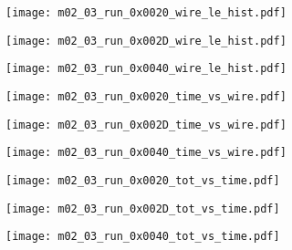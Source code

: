 \documentclass[11pt, ngerman, fleqn, DIV=15, headinclude, BCOR=2cm]{scrreprt}
\begin{document}
\begin{appendix}

	\begin{figure}
		\centering
	\begin{subfigure}[a]{0.45 \textwidth}
		\texttt{[image: m02\_03\_run\_0x0020\_wire\_le\_hist.pdf]}
		\caption{%
		}
		\label{fig:m02_03_run_0x0020_wire_le_hist}
	\end{subfigure}
	\begin{subfigure}[a]{0.45 \textwidth}
		\centering
		\texttt{[image: m02\_03\_run\_0x002D\_wire\_le\_hist.pdf]}
		\caption{%
		}
		\label{fig:m02_03_run_0x002D_wire_le_hist}
	\end{subfigure}
	\begin{subfigure}[a]{0.45 \textwidth}
		\centering
		\texttt{[image: m02\_03\_run\_0x0040\_wire\_le\_hist.pdf]}
		\caption{%
		}
		\label{fig:m02_03_run_0x0040_wire_le_hist}
	\end{subfigure}
	\caption{%
	}
	\label{fig:m02_03_wire_le_hist}
	\end{figure}


	\begin{figure}
		\centering
	\begin{subfigure}[a]{0.45 \textwidth}
		\texttt{[image: m02\_03\_run\_0x0020\_time\_vs\_wire.pdf]}
		\caption{%
		}
		\label{fig:m02_03_run_0x0020_time_vs_wire}
	\end{subfigure}
	\begin{subfigure}[a]{0.45 \textwidth}
		\texttt{[image: m02\_03\_run\_0x002D\_time\_vs\_wire.pdf]}
		\caption{%
		}
		\label{fig:m02_03_run_0x002D_time_vs_wire}
	\end{subfigure}
	\begin{subfigure}[a]{0.45 \textwidth}
		\texttt{[image: m02\_03\_run\_0x0040\_time\_vs\_wire.pdf]}
		\caption{%
		}
		\label{fig:m02_03_run_0x0040_time_vs_wire}
	\end{subfigure}
	\caption{%
	}
	\label{fig:m02_03_time_vs_wire}
	\end{figure}


	\begin{figure}
		\centering
	\begin{subfigure}[a]{0.45 \textwidth}
		\texttt{[image: m02\_03\_run\_0x0020\_tot\_vs\_time.pdf]}
		\caption{%
		}
		\label{fig:m02_03_run_0x0020_tot_vs_time}
	\end{subfigure}
	\begin{subfigure}[a]{0.45 \textwidth}
		\texttt{[image: m02\_03\_run\_0x002D\_tot\_vs\_time.pdf]}
		\caption{%
		}
		\label{fig:m02_03_run_0x002D_tot_vs_time}
	\end{subfigure}
	\begin{subfigure}[a]{0.45 \textwidth}
		\texttt{[image: m02\_03\_run\_0x0040\_tot\_vs\_time.pdf]}
		\caption{%
		}
		\label{fig:m02_03_run_0x0040_tot_vs_time}
	\end{subfigure}
	\caption{%
	}
	\label{fig:m02_03_tot_vs_time}
	\end{figure}





\end{appendix}
\end{document}
